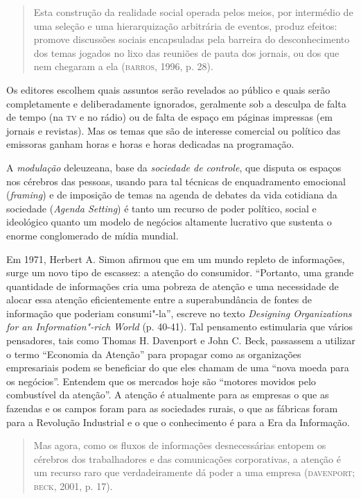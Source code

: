 \begin{quote}
Esta construção da realidade social operada pelos meios, por
intermédio de uma seleção e uma hierarquização arbitrária de eventos,
produz efeitos: promove discussões sociais encapsuladas pela barreira do
desconhecimento dos temas jogados no lixo das reuniões de pauta dos
jornais, ou dos que nem chegaram a ela (\textsc{barros}, 1996, p. 28).
\end{quote}

Os editores escolhem quais assuntos serão revelados ao público e quais
serão completamente e deliberadamente ignorados, geralmente sob a
desculpa de falta de tempo (na \textsc{tv} e no rádio) ou de falta de espaço em
páginas impressas (em jornais e revistas). Mas os temas que são de
interesse comercial ou político das emissoras ganham horas e horas e
horas dedicadas na programação.

A \emph{modulação} deleuzeana, base da \emph{sociedade de controle}, que
disputa os espaços nos cérebros das pessoas, usando para tal técnicas de
enquadramento emocional (\emph{framing}) e de imposição de temas na
agenda de debates da vida cotidiana da sociedade (\emph{Agenda Setting})
é tanto um recurso de poder político, social e ideológico quanto um
modelo de negócios altamente lucrativo que sustenta o enorme
conglomerado de mídia mundial.

Em 1971, Herbert A. Simon afirmou que em um mundo repleto de
informações, surge um novo tipo de escassez: a atenção do consumidor.
``Portanto, uma grande quantidade de informações cria uma pobreza de
atenção e uma necessidade de alocar essa atenção eficientemente entre a
superabundância de fontes de informação que poderiam consumi"-la'',
escreve no texto \emph{Designing Organizations for an Information"-rich
World} (p. 40-41). Tal pensamento estimularia que vários pensadores,
tais como Thomas H. Davenport e John C. Beck, passassem a utilizar o
termo ``Economia da Atenção'' para propagar como as organizações
empresariais podem se beneficiar do que eles chamam de uma ``nova moeda
para os negócios''. Entendem que os mercados hoje são ``motores movidos
pelo combustível da atenção''. A atenção é atualmente para as empresas o
que as fazendas e os campos foram para as sociedades rurais, o que as
fábricas foram para a Revolução Industrial e o que o conhecimento é para
a Era da Informação.

\begin{quote}
Mas agora, como os fluxos de informações desnecessárias entopem os
cérebros dos trabalhadores e das comunicações corporativas, a atenção é
um recurso raro que verdadeiramente dá poder a uma empresa (\textsc{davenport};
\textsc{beck}, 2001, p. 17).
\end{quote}

